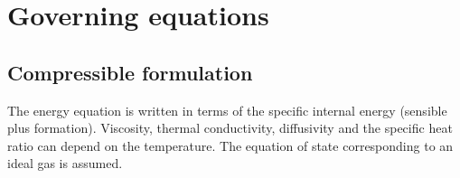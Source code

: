 \chapter{Governing equations}\label{sec:equations}

\section{Compressible formulation}

The energy equation is written in terms of the specific internal energy
(sensible plus formation). Viscosity, thermal conductivity, diffusivity and the
specific heat ratio can depend on the temperature. The equation of state
corresponding to an ideal gas is assumed.

